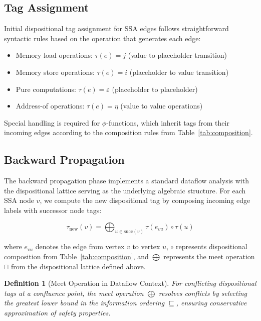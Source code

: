 \documentclass[journal]{IEEEtran}
\newtheorem{definition}{Definition}
\begin{document}
\subsection{Tag Assignment}

Initial dispositional tag assignment for SSA edges follows straightforward syntactic rules based on the operation that generates each edge:

\begin{itemize}
\item Memory load operations: $\tau(e) = j$ (value to placeholder transition)
\item Memory store operations: $\tau(e) = i$ (placeholder to value transition)
\item Pure computations: $\tau(e) = \varepsilon$ (placeholder to placeholder)
\item Address-of operations: $\tau(e) = \eta$ (value to value operations)
\end{itemize}

Special handling is required for $\phi$-functions, which inherit tags from their incoming edges according to the composition rules from Table~\ref{tab:composition}.

\subsection{Backward Propagation}

The backward propagation phase implements a standard dataflow analysis with the dispositional lattice serving as the underlying algebraic structure. For each SSA node $v$, we compute the new dispositional tag by composing incoming edge labels with successor node tags:

\begin{equation}
\tau_{\text{new}}(v) = \bigoplus_{u \in \text{succ}(v)} \tau(e_{vu}) \circ \tau(u)
\end{equation}

where $e_{vu}$ denotes the edge from vertex $v$ to vertex $u$, $\circ$ represents dispositional composition from Table~\ref{tab:composition}, and $\bigoplus$ represents the meet operation $\sqcap$ from the dispositional lattice defined above.

\begin{definition}[Meet Operation in Dataflow Context]
For conflicting dispositional tags at a confluence point, the meet operation $\bigoplus$ resolves conflicts by selecting the greatest lower bound in the information ordering $\sqsubseteq$, ensuring conservative approximation of safety properties.
\end{definition}
\end{document}
